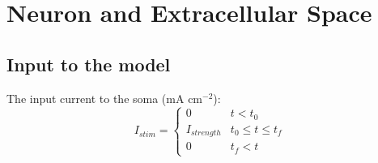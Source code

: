 \documentclass[11pt]{elsarticle}
\begin{document}
\section{Neuron and Extracellular Space}

\subsection{Input to the model}
The input current to the soma (mA cm$^{-2}$):
	\begin{equation}
	I_{stim} = 
	\begin{cases} 
	      0 & t< t_0 \\
	      I_{strength} & t_0\leq t\leq t_f \\
	      0 & t_f< t 
	\end{cases}
	\end{equation}
%
\end{document}
